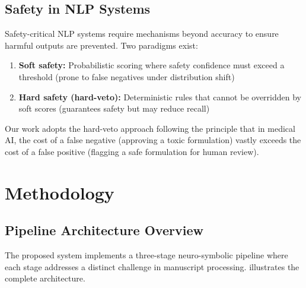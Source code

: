 \documentclass[12pt, a4paper, twoside]{report}
\begin{document}
\section{Safety in NLP Systems}
\label{sec:safety}

Safety-critical NLP systems require mechanisms beyond accuracy to ensure harmful outputs are prevented. Two paradigms exist:

\begin{enumerate}
    \item \textbf{Soft safety:} Probabilistic scoring where safety confidence must exceed a threshold (prone to false negatives under distribution shift)
    \item \textbf{Hard safety (hard-veto):} Deterministic rules that cannot be overridden by soft scores (guarantees safety but may reduce recall)
\end{enumerate}

Our work adopts the hard-veto approach following the principle that in medical AI, the cost of a false negative (approving a toxic formulation) vastly exceeds the cost of a false positive (flagging a safe formulation for human review).


\chapter{Methodology}
\label{ch:methodology}

\section{Pipeline Architecture Overview}
\label{sec:architecture}

The proposed system implements a three-stage neuro-symbolic pipeline where each stage addresses a distinct challenge in manuscript processing.  illustrates the complete architecture.
\end{document}
